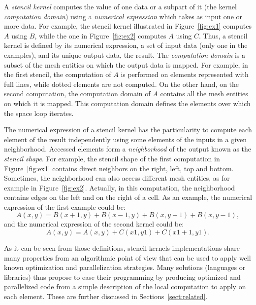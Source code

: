 
A \emph{stencil kernel} computes the value of one data or a subpart of it (the kernel \emph{computation domain}) using a \emph{numerical expression} which takes as input one or more data.
For example, the stencil kernel illustrated in Figure~\ref{fig:ex1} computes $A$ using $B$, while the one in Figure~\ref{fig:ex2} computes $A$ using $C$. Thus, a stencil kernel is defined by its numerical expression, a set of input data (only one in the examples), and its unique output data, the result. 
The \emph{computation domain} is a subset of the mesh entities on which the output data is mapped. For example, in the first stencil, the computation of $A$ is performed on elements represented with full lines, while dotted elements are not computed. On the other hand, on the second computation, the computation domain of $A$ contains all the mesh entities on which it is mapped. This computation domain defines the elements over which the space loop iterates.

The numerical expression of a stencil kernel has the particularity to compute each element of the result independently using some elements of the inputs in a given neighborhood.
Accessed elements form a \emph{neighborhood} of the output known as the \emph{stencil shape}. For example, the stencil shape of the first computation in Figure~\ref{fig:ex1} contains direct neighbors on the right, left, top and bottom. Sometimes, the neighborhood can also access different mesh entities, as for example in Figure~\ref{fig:ex2}. Actually, in this computation, the neighborhood contains edges on the left and on the right of a cell. As an example, the numerical expression of the first example could be:
\begin{equation*} 
A(x,y) = B(x+1,y)+B(x-1,y)+B(x,y+1)+B(x,y-1),
\end{equation*}
and the numerical expression of the second kernel could be:
\begin{equation*} 
A(x,y) = A(x,y)+C(x1,y1)+C(x1+1,y1).
\end{equation*}

As it can be seen from those definitions, stencil kernels implementations share many properties from an algorithmic point of view that can be used to apply well known optimization and parallelization strategies.
Many solutions (languages or libraries) thus propose to ease their programming by producing optimized and parallelized code from a simple description of the local computation to apply on each element.
These are further discussed in Sections~\ref{sect:related}.

